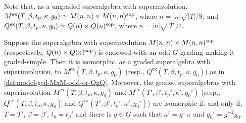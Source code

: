 Note that, as a ungraded superalgebra with superinvolution, $M^{\mathrm{ex}}(T, \beta, t_p, \kappa, g_0) \simeq M(n,n)\times M(n,n)^{\mathrm{sop}}$, where $n = |\kappa| \sqrt{|T|/8}$, and $Q^{\mathrm{ex}}(T, \beta, t_p, \kappa, g_0) \simeq Q(n)\times Q(n)^{\mathrm{sop}}$, where $n = |\kappa| \sqrt{|T|/4}$.

\begin{thm}\label{thm:MxM-odd}
    Suppose the superalgebra with superinvolution $M(n,n) \times M(n,n)^{\mathrm{sop}}$ (respectively, $Q(n) \times Q(n)^{\mathrm{sop}}$) is endowed with an odd $G$-grading making it graded-simple. 
    Then it is isomorphic, as a graded superalgebra with superinvolution, to $M^{\mathrm{ex}}(T,\beta, t_p, \kappa, g_0)$ (resp., $Q^{\mathrm{ex}}(T,\beta, t_p, \kappa, g_0)$) as in \cref{def:model-grd-MxM-odd-or-QxQ}. 
    Moreover, the graded superalgebras with superinvolution $M^{\mathrm{ex}} (T, \beta,  t_p, \kappa, g_0)$  and $M^{\mathrm{ex}} (T', \beta',  t_p', \kappa', g_0')$ (resp., $Q^{\mathrm{ex}} (T, \beta,  t_p, \kappa, g_0)$ and $Q^{\mathrm{ex}} (T', \beta',  t_p', \kappa', g_0')$) are isomorphic if, and only if, $T =T'$, $\beta = \beta'$, $t_p = t_p'$ and there is $g \in G$ such that $\kappa' = g\cdot\kappa$ and $g_0' = g^{-2}g_0$. 
\end{thm}

